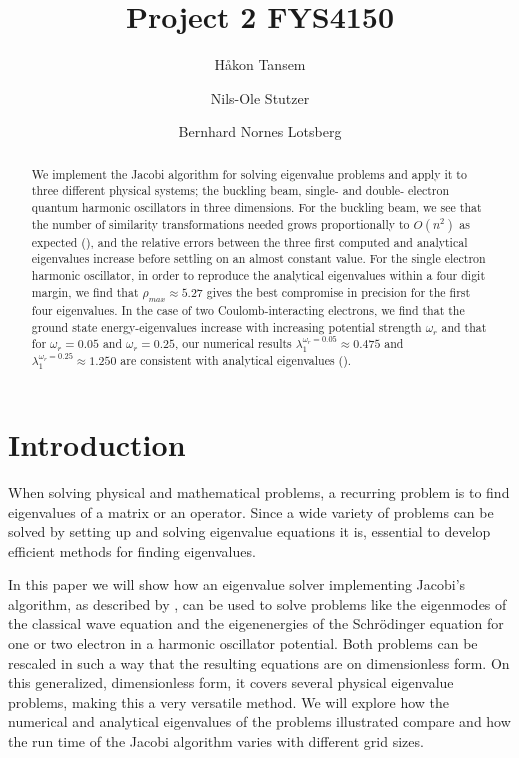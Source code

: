 \documentclass[twocolumn]{aastex62}
\begin{document}
\title{Project 2 FYS4150}

\author{Håkon Tansem}

\author{Nils-Ole Stutzer}

\author{Bernhard Nornes Lotsberg}

\begin{abstract}

We implement the Jacobi algorithm for solving eigenvalue problems and apply it to three different physical systems; the buckling beam, single- and double- electron quantum harmonic oscillators in three dimensions. For the buckling beam, we see that the number of similarity transformations needed grows proportionally to $O(n^2)$ as expected  (\cite{Jensen:2015}), and the relative errors between the three first computed and analytical eigenvalues increase before settling on an almost constant value. For the single electron harmonic oscillator, in order to reproduce the analytical eigenvalues within a four digit margin, we find that $\rho_{max}\approx 5.27$ gives the best compromise in precision for the first four eigenvalues. In the case of two Coulomb-interacting electrons, we find that the ground state energy-eigenvalues increase with increasing potential strength $\omega_r$ and that for $\omega_r=0.05$ and $\omega_r=0.25$, our numerical results $\lambda_1^{\omega_r=0.05}\approx 0.475$ and $\lambda_1^{\omega_r=0.25}\approx 1.250$ are consistent with analytical eigenvalues (\cite{taut:1993}).
\end{abstract}

\section{Introduction} \label{sec:intro}
When solving physical and mathematical problems, a recurring problem is to find eigenvalues of a matrix or an operator. Since a wide variety of problems can be solved by setting up and solving eigenvalue equations it is, essential to develop efficient methods for finding eigenvalues. 

In this paper we will show how an eigenvalue solver implementing Jacobi's algorithm, as described by \citep[Ch. 7.4]{Jensen:2015}, can be used to solve problems like the eigenmodes of the classical wave equation and the eigenenergies of the Schrödinger equation for one or two electron in a harmonic oscillator potential. Both problems can be rescaled in such a way that the resulting equations are on dimensionless form. On this generalized, dimensionless form, it covers several physical eigenvalue problems, making this a very versatile method. We will explore how the numerical and analytical eigenvalues of the problems illustrated compare and how the run time of the Jacobi algorithm varies with different grid sizes.
\end{document}
